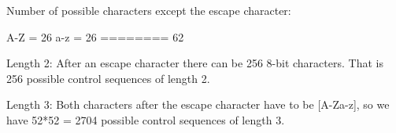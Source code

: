 Number of possible characters except the escape character:

A-Z = 26
a-z = 26
========
      62

Length 2: After an escape character there can be 256 8-bit
characters. That is 256 possible control sequences of length 2.

Length 3: Both characters after the escape character have to be
[A-Za-z], so we have 52*52 = 2704 possible control sequences of
length 3.
